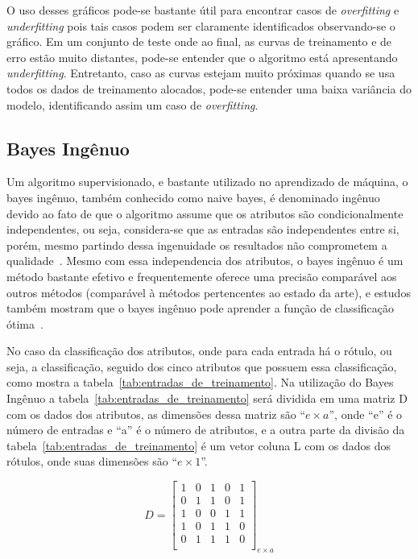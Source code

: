 O uso desses gráficos pode-se bastante útil para encontrar casos de \textit{overfitting}
e \textit{underfitting} pois tais casos podem ser claramente identificados observando-se
o gráfico. Em um conjunto de teste onde ao final, as curvas de treinamento e de erro estão
muito distantes, pode-se entender que o algoritmo está apresentando \textit{underfitting}.
Entretanto, caso as curvas estejam muito próximas quando se usa todos os dados de
treinamento alocados, pode-se entender uma baixa variância do modelo, identificando assim
um caso de \textit{overfitting}.

\subsection{Bayes Ingênuo}

Um algoritmo supervisionado, e bastante utilizado no aprendizado de máquina,
o bayes ingênuo, também conhecido como naive bayes, é denominado ingênuo devido
ao fato de que o algoritmo assume que os atributos são condicionalmente
independentes, ou seja, considera-se que as entradas são independentes entre
si, porém, mesmo partindo dessa ingenuidade os resultados não comprometem a
qualidade~\cite{bruno2010aprendizadomaquina}. Mesmo com essa independencia dos
atributos, o bayes ingênuo é um método bastante efetivo e frequentemente oferece
uma precisão comparável aos outros métodos (comparável à métodos pertencentes ao
estado da arte), e estudos também mostram que o bayes ingênuo pode aprender a
função de classificação ótima~\cite{santos2010naivebayes}.

No caso da classificação dos atributos, onde para cada entrada há o rótulo, ou
seja, a classificação, seguido dos cinco atributos que possuem essa classificação,
como mostra a tabela~\ref{tab:entradas_de_treinamento}. Na utilização do Bayes
Ingênuo a tabela~\ref{tab:entradas_de_treinamento} será dividida em uma matriz D
com os dados dos atributos, as dimensões dessa matriz são ``${e \times a}$'', onde
``e'' é o número de entradas e ``a'' é o número de atributos, e a outra parte da
divisão da tabela~\ref{tab:entradas_de_treinamento} é um vetor coluna L com os
dados dos rótulos, onde suas dimensões são ``${e \times 1}$''.

$$D=\left[
\begin{array}{ccccc}
1 & 0 & 1 & 0 & 1 \\
0 & 1 & 1 & 0 & 1 \\
1 & 0 & 0 & 1 & 1 \\
1 & 0 & 1 & 1 & 0 \\
0 & 1 & 1 & 1 & 0 \\
\end{array}
\right]_{e \times a}$$


